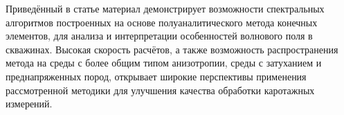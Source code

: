 \documentclass[a4paper,11pt]{article}
\begin{document}

Приведённый в статье материал демонстрирует возможности спектральных алгоритмов построенных на основе полуаналитического метода конечных элементов, для анализа и интерпретации особенностей волнового поля в скважинах. Высокая скорость расчётов, а также возможность распространения метода на среды с более общим типом анизотропии, среды с затуханием и преднапряженных пород, открывает широкие перспективы применения рассмотренной методики для улучшения качества обработки каротажных измерений. 

%
%
\clearpage

%
%

%


%
\end{document}
